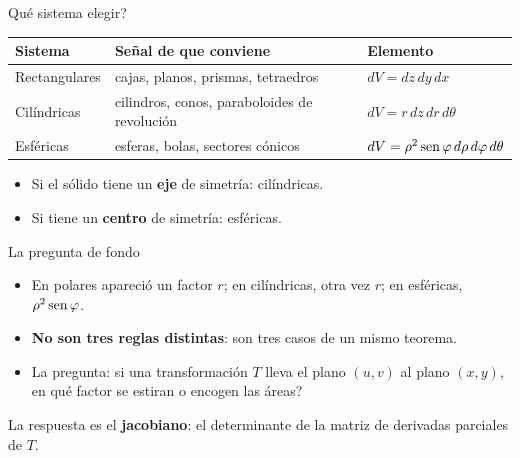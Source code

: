 \documentclass[11pt,aspectratio=169]{beamer}
\begin{document}
\begin{frame}{\textquestiondown{}Qué sistema elegir?}
  \begin{center}
  \renewcommand{\arraystretch}{1.5}
  \small
  \begin{tabular}{lll}
    \toprule
    \textbf{Sistema} & \textbf{Señal de que conviene} & \textbf{Elemento}\\
    \midrule
    Rectangulares
      & cajas, planos, prismas, tetraedros
      & $dV=dz\,dy\,dx$\\
    Cilíndricas
      & cilindros, conos, paraboloides de revolución
      & $dV=r\,dz\,dr\,d\theta$\\
    Esféricas
      & esferas, bolas, sectores cónicos
      & $dV=\rho^2\operatorname{sen}\varphi\,d\rho\,d\varphi\,d\theta$\\
    \bottomrule
  \end{tabular}
  \end{center}
  \vspace{10pt}
  \pause
  \begin{itemize}
    \item Si el sólido tiene un \textbf{eje} de simetría: cilíndricas.
    \item Si tiene un \textbf{centro} de simetría: esféricas.
  \end{itemize}
  \pause
\end{frame}


\begin{frame}{La pregunta de fondo}
  \begin{itemize}
    \item En polares apareció un factor $r$; en cilíndricas, otra vez $r$; en esféricas, $\rho^2\operatorname{sen}\varphi$.
    \pause
    \item \textbf{No son tres reglas distintas}: son tres casos de un mismo teorema.
    \pause
    \item La pregunta: si una transformación $T$ lleva el plano $(u,v)$ al plano $(x,y)$, \textquestiondown{}en qué factor se estiran o encogen las áreas?
  \end{itemize}
  \vspace{10pt}
  \pause
  \begin{center}
  \normalsize\color{tealx} La respuesta es el \textbf{jacobiano}: el determinante de la matriz de derivadas parciales de $T$.
  \end{center}
\end{frame}
\end{document}
